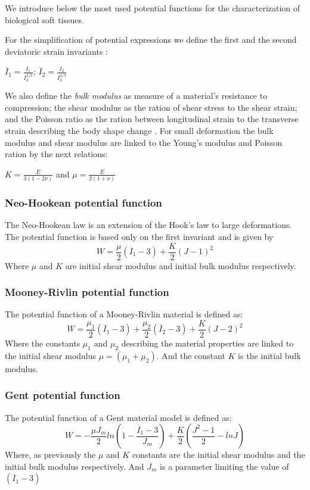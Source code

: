 We introduce below the most used potential functions for the characterization of biological soft tissues.
 
For the simplification of potential expressions we define the first and the second deviatoric strain invariants :
\begin{center}
$\overline{I}_1=\frac{I_1}{I_3^{2/3}} $;  $\overline{I}_2=\frac{I_2}{I_3^{4/3}}$
\end{center}

We also define the \textit{ bulk modulus} as measure of a material's resistance to compression; the shear modulus as the ration of shear stress to the shear strain; and the Poisson ratio as the ration between longitudinal strain to the transverse strain describing the body shape change . For small deformation the bulk modulus and shear modulus are linked to the Young's modulus and Poisson ration by the next relations:
 \begin{center}
  $K = \frac{E}{3(1-2\nu)}$ and $\mu = \frac{E}{2(1+\nu)}$
 \end{center}
  
\subsubsection*{Neo-Hookean potential function}
The Neo-Hookean \citep{treloar_elasticity_1943} law is an extension of the Hook's law to large deformations. The potential function is based only on the first invariant and is given by 
\begin{equation}
\label{eq:Neo-Hookmodel}
W =\frac{\mu}{2} (\overline{I}_1-3) + \frac{K}{2}(J-1)^2
\end{equation}
Where $\mu$ and $K$ are initial shear modulus and initial bulk modulus respectively. 
\subsubsection*{Mooney-Rivlin potential function}
The potential function of a Mooney-Rivlin \citep{rivlin_large_1951} material is defined as:
\begin{equation}
\label{eq:mooneyRivlingmodel}
W=\frac{\mu_1}{2}(\overline{I}_1-3)+\frac{\mu_2}{2}(\overline{I}_2-3)+\frac{K}{2}(J-2)^2
\end{equation}
Where the constants $\mu_1$ and $\mu_2$ describing the material properties are linked to the initial shear modulus $\mu = (\mu_1+\mu_2)$. And the constant $K$ is the initial bulk modulus. 

\subsubsection*{Gent potential function}
The potential function of a Gent \citep{gent_forms_1958} material model is defined as:
\begin{equation}
\label{gentmodel}
W=-\frac{\mu J_m}{2}ln\left(1-\frac{\overline{I}_1-3}{J_m}\right)+\frac{K}{2}\left(\frac{J^2-1}{2}-lnJ\right)
\end{equation}
 Where, as previously the $\mu$ and $K$ constants are the initial shear modulus and the initial bulk modulus respectively. And $J_m$ is a parameter limiting the value of $(\overline{I}_1-3)$
